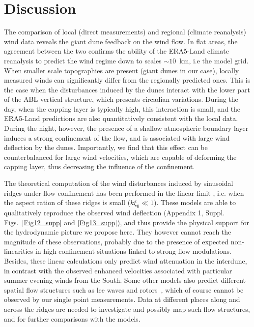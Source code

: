 \section{Discussion}
The comparison of local (direct measurements) and regional (climate reanalysis) wind data reveals the giant dune feedback on the wind flow. In flat areas, the agreement between the two confirms the ability of the ERA5-Land climate reanalysis to predict the wind regime down to scales $\sim10$~km, i.e the model grid. When smaller scale topographies are present (giant dunes in our case), locally measured winds can significantly differ from the regionally predicted ones. This is the case when the disturbances induced by the dunes interact with the lower part of the ABL vertical structure, which presents circadian variations. During the day, when the capping layer is typically high, this interaction is small, and the ERA5-Land predictions are also quantitatively consistent with the local data. During the night, however, the presence of a shallow atmospheric boundary layer induces a strong confinement of the flow, and is associated with large wind deflection by the dunes. Importantly, we find that this effect can be counterbalanced for large wind velocities, which are capable of deforming the capping layer, thus decreasing the influence of the confinement.

The theoretical computation of the wind disturbances induced by sinusoidal ridges under flow confinement has been performed in the linear limit \citep{andreotti2009, Andreotti2012}, i.e. when the aspect ration of these ridges is small ($k\xi_0 \ll 1$). These models are able to qualitatively reproduce the observed wind deflection (Appendix 1, Suppl. Figs.~\ref{Fig12_supp} and \ref{Fig13_supp}), and thus provide the physical support for the hydrodynamic picture we propose here. They however cannot reach the magnitude of these observations, probably due to the presence of expected non-linearities in high confinement situations linked to strong flow modulations. Besides, these linear calculations only predict wind attenuation in the interdune, in contrast with the observed enhanced velocities associated with particular summer evening winds from the South. Some other models also predict different spatial flow structures such as lee waves and rotors~\citep{baines1995, Vosper2004}, which of course cannot be observed by our single point measurements. Data at different places along and across the ridges are needed to investigate and possibly map such flow structures, and for further comparisons with the models.

